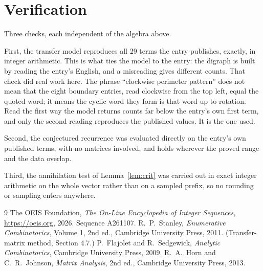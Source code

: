 \documentclass[11pt,a4paper]{article}
\theoremstyle{plain}
\theoremstyle{definition}
\begin{document}
\section{Verification}

Three checks, each independent of the algebra above.

First, the transfer model reproduces all $29$ terms the entry publishes, exactly, in
integer arithmetic. This is what ties the model to the entry: the digraph is built by reading
the entry's English, and a misreading gives different counts. That check did real work here. The phrase ``clockwise perimeter pattern'' does not mean that the eight boundary entries, read clockwise from the top left, equal the quoted word; it means the cyclic word they form is that word up to rotation. Read the first way the model returns counts far below the entry's own first term, and only the second reading reproduces the published values. It is the one used.

Second, the conjectured recurrence was evaluated directly on the entry's own published terms,
with no matrices involved, and holds wherever the proved range and the data overlap.

Third, the annihilation test of Lemma~\ref{lem:crit} was carried out in exact integer
arithmetic on the whole vector rather than on a sampled prefix, so no rounding or sampling
enters anywhere.

\begin{thebibliography}{9}
 The OEIS Foundation, \emph{The On-Line Encyclopedia of Integer
Sequences}, \url{https://oeis.org}, 2026. Sequence A261107.
 R.~P.~Stanley, \emph{Enumerative Combinatorics}, Volume 1, 2nd ed.,
Cambridge University Press, 2011. (Transfer-matrix method, Section 4.7.)
 P.~Flajolet and R.~Sedgewick, \emph{Analytic Combinatorics}, Cambridge
University Press, 2009.
 R.~A.~Horn and C.~R.~Johnson, \emph{Matrix Analysis}, 2nd ed., Cambridge
University Press, 2013.
\end{thebibliography}
\end{document}
